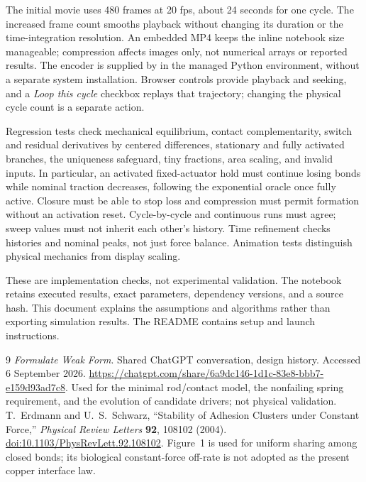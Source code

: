 \documentclass[11pt,a4paper]{article}
\newcommand{\code}[1]{\texttt{\detokenize{#1}}}
\begin{document}
The initial movie uses 480 frames at 20 fps, about 24 seconds for one cycle.
The increased frame count smooths playback without changing its duration or
the time-integration resolution. An embedded MP4 keeps the inline notebook
size manageable; compression affects images only, not numerical arrays or
reported results. The encoder is supplied by \code{imageio-ffmpeg} in the
managed Python environment, without a separate system installation. Browser
controls provide playback and seeking, and a \emph{Loop this cycle} checkbox
replays that trajectory; changing the physical cycle count is a separate action.

Regression tests check mechanical equilibrium, contact complementarity,
switch and residual derivatives by centered differences, stationary and fully
activated branches, the uniqueness safeguard, tiny fractions, area scaling,
and invalid inputs. In particular, an activated fixed-actuator hold must
continue losing bonds while nominal traction decreases, following the
exponential oracle once fully active. Closure must be able to stop loss and
compression must permit formation without an activation reset. Cycle-by-cycle
and continuous runs must agree; sweep values must not inherit each other's
history. Time refinement checks histories and nominal peaks, not just force
balance. Animation tests distinguish physical mechanics from display scaling.

These are implementation checks, not experimental validation. The notebook
retains executed results, exact parameters, dependency versions, and a source
hash. This document explains the assumptions and algorithms rather than
exporting simulation results. The README contains setup and launch instructions.

\begin{thebibliography}{9}
\emph{Formulate Weak Form}. Shared ChatGPT conversation, design history.
Accessed 6 September 2026.
\url{https://chatgpt.com/share/6a9dc146-1d1c-83e8-bbb7-e159d93ad7c8}.
Used for the minimal rod/contact model, the nonfailing spring requirement,
and the evolution of candidate drivers; not physical validation.
T.~Erdmann and U.~S.~Schwarz, ``Stability of Adhesion Clusters under Constant
Force,'' \emph{Physical Review Letters} \textbf{92}, 108102 (2004).
\href{https://doi.org/10.1103/PhysRevLett.92.108102}{doi:10.1103/PhysRevLett.92.108102}.
Figure~1 is used for uniform sharing among closed bonds; its biological
constant-force off-rate is not adopted as the present copper interface law.
\end{thebibliography}
\end{document}
